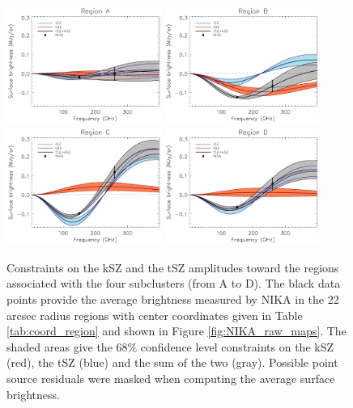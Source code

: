 \documentclass[twocolumn,traditabstract]{aa}
\begin{document}
\begin{figure}[h]
\centering
\includegraphics[width=0.45\textwidth]{Figure/SZ_spectrum_region_A22.pdf}
\includegraphics[width=0.45\textwidth]{Figure/SZ_spectrum_region_B22.pdf}
\includegraphics[width=0.45\textwidth]{Figure/SZ_spectrum_region_C22.pdf}
\includegraphics[width=0.45\textwidth]{Figure/SZ_spectrum_region_D22.pdf}
\caption{\footnotesize{Constraints on the kSZ and the tSZ amplitudes toward the regions associated with the four subclusters (from A to D). The black data points provide the average brightness measured by NIKA in the 22 arcsec radius regions with center coordinates given in Table \ref{tab:coord_region} and shown in Figure  \ref{fig:NIKA_raw_maps}. The shaded areas give the 68\% confidence level constraints on the kSZ (red), the tSZ (blue) and the sum of the two (gray). Possible point source residuals were masked when computing the average surface brightness.}}
\label{fig:spectra_in_regions}
\end{figure}
\end{document}
